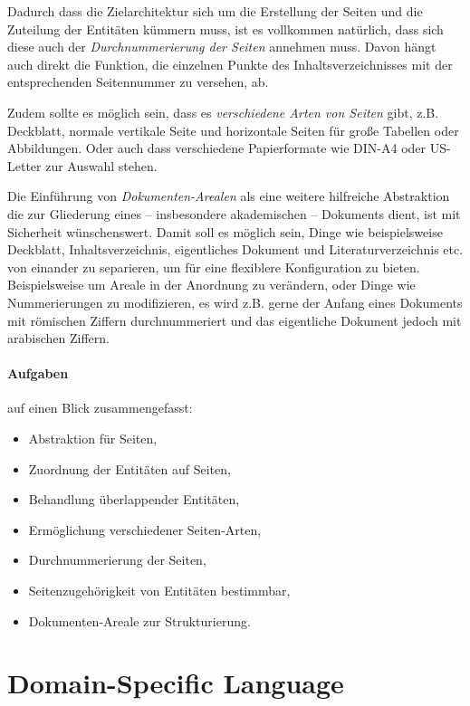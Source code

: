 Dadurch dass die Zielarchitektur sich um die Erstellung der Seiten und
die Zuteilung der Entitäten kümmern muss, ist es vollkommen natürlich,
dass sich diese auch der \emph{Durchnummerierung der Seiten} annehmen muss.
Davon hängt auch direkt die Funktion, die einzelnen Punkte des
Inhaltsverzeichnisses mit der entsprechenden Seitennummer zu versehen, ab.

Zudem sollte es möglich sein, dass es \emph{verschiedene Arten von Seiten}
gibt, z.B. Deckblatt, normale vertikale Seite und horizontale Seiten für
große Tabellen oder Abbildungen. Oder auch dass verschiedene Papierformate
wie DIN-A4 oder US-Letter zur Auswahl stehen.

Die Einführung von \emph{Dokumenten-Arealen} als eine weitere hilfreiche
Abstraktion die zur Gliederung eines -- insbesondere
akademischen -- Dokuments dient, ist mit Sicherheit wünschenswert.
Damit soll es möglich sein, Dinge wie beispielsweise
Deckblatt, Inhaltsverzeichnis, eigentliches Dokument
und Literaturverzeichnis etc. von einander zu separieren, um für eine
flexiblere Konfiguration zu bieten. Beispielsweise um Areale in der Anordnung zu
verändern, oder Dinge wie Nummerierungen zu modifizieren, es wird z.B.
gerne der Anfang eines Dokuments mit römischen Ziffern durchnummeriert
und das eigentliche Dokument jedoch mit arabischen Ziffern.


\paragraph{Aufgaben} auf einen Blick zusammengefasst:

\begin{itemize}
  \item Abstraktion für Seiten,
  \item Zuordnung der Entitäten auf Seiten,
  \item Behandlung überlappender Entitäten,
  \item Ermöglichung verschiedener Seiten-Arten,
  \item Durchnummerierung der Seiten,
  \item Seitenzugehörigkeit von Entitäten bestimmbar,
  \item Dokumenten-Areale zur Strukturierung.
\end{itemize}


\section{Domain-Specific Language}\label{sec-dsl}

